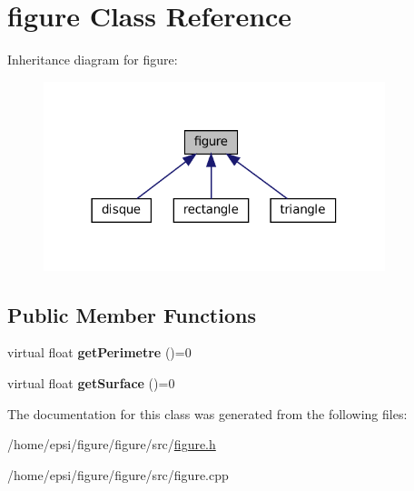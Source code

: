 \hypertarget{classfigure}{}\section{figure Class Reference}
\label{classfigure}


Inheritance diagram for figure\+:
\nopagebreak
\begin{figure}[H]
\begin{center}
\leavevmode
\includegraphics[width=282pt]{classfigure__inherit__graph}
\end{center}
\end{figure}
\subsection*{Public Member Functions}
\begin{DoxyCompactItemize}
\item 
\mbox{\label{classfigure_ad1cc1bebf09fcfcf96490934895d1478}} 
virtual float {\bfseries get\+Perimetre} ()=0
\item 
\mbox{\label{classfigure_ae0301c7790ae10bdce44f034ac825cb4}} 
virtual float {\bfseries get\+Surface} ()=0
\end{DoxyCompactItemize}


The documentation for this class was generated from the following files\+:\begin{DoxyCompactItemize}
\item 
/home/epsi/figure/figure/src/\hyperlink{figure_8h}{figure.\+h}\item 
/home/epsi/figure/figure/src/figure.\+cpp\end{DoxyCompactItemize}
